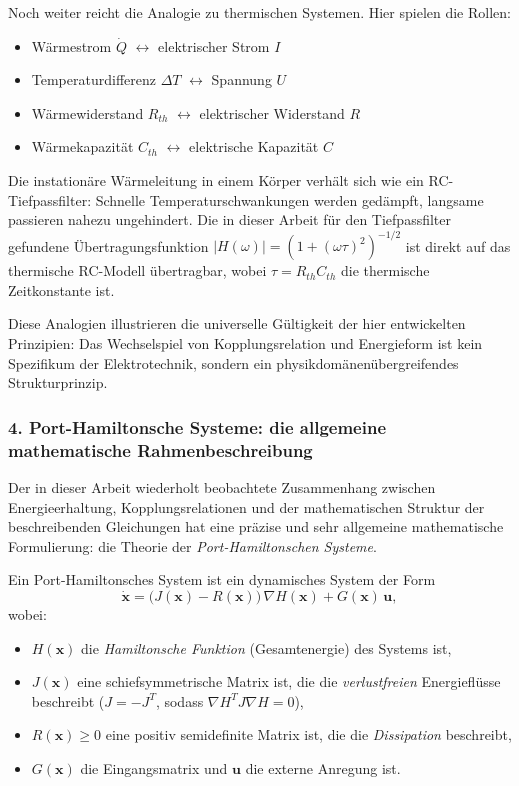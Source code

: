 ﻿\documentclass[12pt, a4paper]{article}
\begin{document}
	Noch weiter reicht die Analogie zu thermischen Systemen. Hier spielen die Rollen:
	\begin{itemize}
		\item Wärmestrom $\dot{Q}$ $\leftrightarrow$ elektrischer Strom $I$
		\item Temperaturdifferenz $\Delta T$ $\leftrightarrow$ Spannung $U$
		\item Wärmewiderstand $R_{th}$ $\leftrightarrow$ elektrischer Widerstand $R$
		\item Wärmekapazität $C_{th}$ $\leftrightarrow$ elektrische Kapazität $C$
	\end{itemize}
	Die instationäre Wärmeleitung in einem Körper verhält sich wie ein RC-Tiefpassfilter: Schnelle Temperaturschwankungen werden gedämpft, langsame passieren nahezu ungehindert. Die in dieser Arbeit für den Tiefpassfilter gefundene Übertragungsfunktion $|H(\omega)| = (1 + (\omega\tau)^2)^{-1/2}$ ist direkt auf das thermische RC-Modell übertragbar, wobei $\tau = R_{th} C_{th}$ die thermische Zeitkonstante ist.

	Diese Analogien illustrieren die universelle Gültigkeit der hier entwickelten Prinzipien: Das Wechselspiel von Kopplungsrelation und Energieform ist kein Spezifikum der Elektrotechnik, sondern ein physikdomänenübergreifendes Strukturprinzip.

	\subsubsection*{4. \quad Port-Hamiltonsche Systeme: die allgemeine mathematische Rahmenbeschreibung}

	Der in dieser Arbeit wiederholt beobachtete Zusammenhang zwischen Energieerhaltung, Kopplungsrelationen und der mathematischen Struktur der beschreibenden Gleichungen hat eine präzise und sehr allgemeine mathematische Formulierung: die Theorie der \textit{Port-Hamiltonschen Systeme}.

	Ein Port-Hamiltonsches System ist ein dynamisches System der Form
	\begin{equation}
		\dot{\mathbf{x}} = \bigl(J(\mathbf{x}) - R(\mathbf{x})\bigr)\, \nabla H(\mathbf{x}) + G(\mathbf{x})\, \mathbf{u},
	\end{equation}
	wobei:
	\begin{itemize}
		\item $H(\mathbf{x})$ die \textit{Hamiltonsche Funktion} (Gesamtenergie) des Systems ist,
		\item $J(\mathbf{x})$ eine schiefsymmetrische Matrix ist, die die \textit{verlustfreien} Energieflüsse beschreibt ($J = -J^T$, sodass $\nabla H^T J \nabla H = 0$),
		\item $R(\mathbf{x}) \geq 0$ eine positiv semidefinite Matrix ist, die die \textit{Dissipation} beschreibt,
		\item $G(\mathbf{x})$ die Eingangsmatrix und $\mathbf{u}$ die externe Anregung ist.
	\end{itemize}
\end{document}
